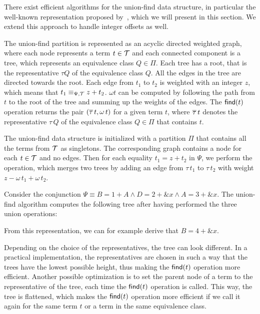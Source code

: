 There exist efficient algorithms for the union-find data structure,
in particular the well-known representation proposed by~\textcite{uf-tarjan},
which we will present in this section.
We extend this approach to handle integer offsets as well.

The union-find partition is represented as an acyclic directed weighted graph,
where each node represents a term $t \in \mathcal{T}$ and
each connected component is a tree, which represents an equivalence class $Q \in \Pi$.
Each tree has a root, that is the representative $\tau Q$ of the equivalence class $Q$.
All the edges in the tree are directed towards the root.
Each edge from $t_1$ to $t_2$ is weighted with an integer $z$,
which means that $t_1 \equiv_{\Psi,\mathcal{T}} z + t_2$.
$\omega t$ can be computed by following the path from $t$ to the root of the tree and summing up the weights of the edges.
The $\textsf{find}(t)$ operation returns the pair $(\overline{\tau}\,t, \omega\,t)$ for a given term $t$,
where $\overline{\tau}\,t$ denotes the representative $\tau\,Q$ of the equivalence class $Q\in\Pi$ that contains $t$.

The union-find data structure is initialized with a partition $\Pi$ that contains all the terms from $\mathcal{T}$ as singletons.
The corresponding graph contains a node for each $t \in \mathcal{T}$ and no edges.
Then for each equality $t_1 = z + t_2$ in $\Psi$, we perform the  operation, which merges two trees by adding an edge from $\tau\,t_1$ to $\tau\,t_2$ with weight $z - \omega\,t_1 + \omega\,t_2$.

\begin{example}
Consider the conjunction $\Psi \equiv B = 1 + A \land D = 2 + \&x \land A = 3 + \&x$.
The union-find algorithm computes the following tree after having performed the three union operations:


From this representation, we can for example derive that $B = 4 + \&x$.

Depending on the choice of the representatives, the tree can look different.
In a practical implementation, the representatives are chosen in such a way that the trees have the lowest possible height,
thus making the $\textsf{find}(t)$ operation more efficient.
Another possible optimization is to set the parent node of a term to the representative of the tree,
each time the $\textsf{find}(t)$ operation is called.
This way, the tree is flattened, which makes the $\textsf{find}(t)$ operation
more efficient if we call it again for the same term $t$ or a term in the same equivalence class.
\end{example}

